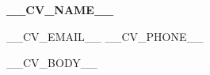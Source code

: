 \documentclass[UTF8, 11pt, a4paper]{ctexart}
\begin{document}
{\centering
  {\LARGE\bfseries __CV_NAME__}\par
  \vspace{3pt}
  {\small __CV_EMAIL__ \quad\textbullet\quad __CV_PHONE__}\par
  \vspace{4pt}
  \textcolor{cvblue}{\titlerule[1pt]}\par
  \vspace{6pt}
}

__CV_BODY__
\end{document}

